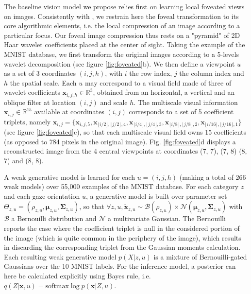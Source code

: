 \documentclass{article}
\begin{document}
The baseline vision model we propose relies first on learning local foveated views on images.
Consistently with \cite{kortum1996implementation,wang2003foveation}, we restrain here the foveal transformation to its core algorithmic elements, i.e. the local compression of an image according to a particular focus. Our foveal image compression thus rests on a "pyramid" of 2D Haar wavelet coefficients placed at the center of sight. Taking the example of the MNIST database, we first transform the original images according to a 5-levels wavelet decomposition (see figure \ref{fig:foveated}b). We then define a viewpoint $u$ as a set of 3 coordinates $(i,j,h)$, with $i$ the row index, $j$ the column index and $h$ the spatial scale. Each $u$ may correspond to a visual field made of three of wavelet coefficients $\boldsymbol{x}_{i,j,h} \in \mathbb{R}^3$, obtained from an horizontal, a vertical and an oblique filter at location $(i,j)$ and scale $h$.  The multiscale visual information $\boldsymbol{x}_{i,j} \in \mathbb{R}^{15}$ available at coordinates $(i,j)$ corresponds to a set of 5 coefficient triplets, namely $\boldsymbol{x}_{i,j}=\{\boldsymbol{x}_{i,j,5}, \boldsymbol{x}_{\lfloor i/2\rfloor,\lfloor j/2\rfloor,4}, \boldsymbol{x}_{\lfloor i/4\rfloor,\lfloor j/4\rfloor,3}, \boldsymbol{x}_{\lfloor i/8\rfloor,\lfloor j/8\rfloor, 2}, \boldsymbol{x}_{\lfloor i/16\rfloor,\lfloor j/16\rfloor, 1}\}$ (see figure \ref{fig:foveated}c), so that each multiscale visual field owns 15 coefficients (as opposed to 784 pixels in the original image).
Fig. \ref{fig:foveated}d displays a reconstructed image from the 4 central viewpoints at coordinates (7, 7), (7, 8) (8, 7) and (8, 8).

A weak generative model is learned for each $u = (i,j,h)$ (making a total of 266 weak models) over 55,000 examples of the MNIST database. For each category $z$ and each gaze orientation $u$, a generative model is built over parameter set $\Theta_{z,u} = (\rho_{z,u}, \boldsymbol{\mu}_{z,u}, \boldsymbol{\Sigma}_{z,u})$, so that $\forall z,u, \tilde{\boldsymbol{x}}_{z,u} \sim \mathcal{B}(\rho_{z,u}) \times \mathcal{N}(\boldsymbol{\mu}_{z,u}, \boldsymbol{\Sigma}_{z,u})$ with $\mathcal{B}$ a Bernouilli distribution and $\mathcal{N}$ a multivariate Gaussian. The Bernouilli reports the case where the coefficient triplet is null in the considered portion of the image (which is quite common in the periphery of the image), which results in discarding the corresponding triplet from the Gaussian moments calculation. Each resulting weak generative model $p(X|z,u)$ is a mixture of Bernouilli-gated Gaussians over the 10 MNIST labels. For the inference model, a posterior can here be calculated explicitly using Bayes rule, i.e. $q(Z|\boldsymbol{x},u) = \text{softmax} \log p(\boldsymbol{x}|Z,u)$.
\end{document}
